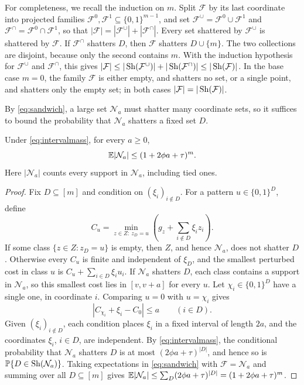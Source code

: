 For completeness, we recall the induction on $m$. Split $\mathcal F$ by
its last coordinate into projected families
$\mathcal F^0,\mathcal F^1\subseteq\{0,1\}^{m-1}$, and set
$\mathcal F^\cup=\mathcal F^0\cup\mathcal F^1$ and
$\mathcal F^\cap=\mathcal F^0\cap\mathcal F^1$, so that
$|\mathcal F|=|\mathcal F^\cup|+|\mathcal F^\cap|$. Every set shattered
by $\mathcal F^\cup$ is shattered by $\mathcal F$. If $\mathcal F^\cap$
shatters $D$, then $\mathcal F$ shatters $D\cup\{m\}$. The two
collections are disjoint, because only the second contains $m$. With the
induction hypothesis for $\mathcal F^\cup$ and $\mathcal F^\cap$, this
gives $|\mathcal F|\le|\operatorname{Sh}(\mathcal F^\cup)|+|\operatorname{Sh}(\mathcal F^\cap)|
\le|\operatorname{Sh}(\mathcal F)|$. In the base case $m=0$, the family $\mathcal F$
is either empty, and shatters no set, or a single point, and shatters
only the empty set; in both cases $|\mathcal F|=|\operatorname{Sh}(\mathcal F)|$.

By \eqref{eq:sandwich}, a large set $\mathcal N_a$ must shatter many
coordinate sets, so it suffices to bound the probability that
$\mathcal N_a$ shatters a fixed set $D$.

\begin{lemma}\label{lem:count}
Under \eqref{eq:intervalmass}, for every $a\ge0$,
\begin{equation}\label{eq:count}
 \mathbb E|\mathcal N_a|\le(1+2\phi a+\tau)^m.
\end{equation}
Here $|\mathcal N_a|$ counts every support in $\mathcal N_a$, including
tied ones.
\end{lemma}

\begin{proof}
Fix $D\subseteq[m]$ and condition on $(\xi_i)_{i\notin D}$. For a pattern
$u\in\{0,1\}^D$, define
\[
 C_u=\min_{z\in Z:\ z_D=u}
          \left(g_z+\sum_{i\notin D}\xi_i z_i\right).
\]
If some class $\{z\in Z:z_D=u\}$ is empty, then $Z$, and hence
$\mathcal N_a$, does not shatter $D$. Otherwise every $C_u$ is finite and
independent of $\xi_D$, and the smallest perturbed cost in class $u$ is
$C_u+\sum_{i\in D}\xi_iu_i$. If $\mathcal N_a$ shatters $D$, each class
contains a support in $\mathcal N_a$, so this smallest cost lies in
$[v,v+a]$ for every $u$. Let $\chi_i\in\{0,1\}^D$ have a single one, in
coordinate $i$. Comparing $u=0$ with $u=\chi_i$ gives
\[
 |C_{\chi_i}+\xi_i-C_0|\le a\qquad(i\in D).
\]
Given $(\xi_i)_{i\notin D}$, each condition places $\xi_i$ in a fixed
interval of length $2a$, and the coordinates $\xi_i$, $i\in D$, are
independent. By \eqref{eq:intervalmass}, the conditional probability
that $\mathcal N_a$ shatters $D$ is at most $(2\phi a+\tau)^{|D|}$, and
hence so is $\mathbb P\{D\in\operatorname{Sh}(\mathcal N_a)\}$. Taking expectations in
\eqref{eq:sandwich} with $\mathcal F=\mathcal N_a$ and summing over all
$D\subseteq[m]$ gives
$\mathbb E|\mathcal N_a|\le\sum_{D}(2\phi a+\tau)^{|D|}=(1+2\phi a+\tau)^m$.
\end{proof}


